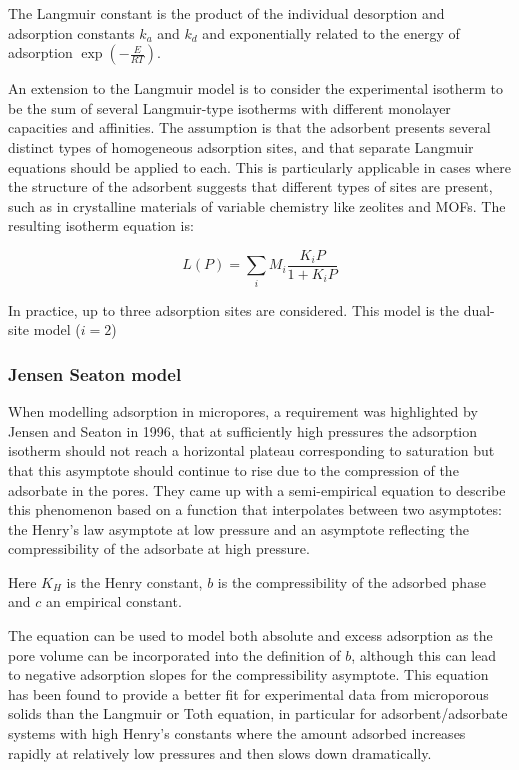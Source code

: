The Langmuir constant is the product of the individual desorption and adsorption constants
\(k_a\) and \(k_d\) and exponentially related to the energy of adsorption
\(\exp{(-\frac{E}{RT})}\).

An extension to the Langmuir model is to consider the experimental isotherm to be
the sum of several Langmuir-type isotherms with different monolayer capacities and affinities.
The assumption is that the adsorbent presents several distinct types of homogeneous adsorption
sites, and that separate Langmuir equations should be applied to each. This is particularly
applicable in cases where the structure of the adsorbent suggests that different types of
sites are present, such as in crystalline materials of variable chemistry like zeolites and MOFs.
The resulting isotherm equation is:

\begin{equation}
    L(P) = \sum_i M_i\frac{K_i P}{1+K_i P}
\end{equation}

In practice, up to three adsorption sites are considered.
This model is the dual-site model (\(i=2\))

\subsubsection{Jensen Seaton model}

When modelling adsorption in micropores, a requirement was highlighted by
Jensen and Seaton in 1996, that at sufficiently high pressures the adsorption
isotherm should not reach a horizontal plateau corresponding to saturation but
that this asymptote should continue to rise due to the compression of the adsorbate
in the pores. They came up with a semi-empirical equation to describe this phenomenon
based on a function that interpolates between two asymptotes: the Henry’s law asymptote
at low pressure and an asymptote reflecting the compressibility of the adsorbate at
high pressure.

Here \(K_H\) is the Henry constant, \(b\) is the compressibility of the
adsorbed phase and \(c\) an empirical constant.

The equation can be used to model both absolute and excess adsorption as the pore
volume can be incorporated into the definition of \(b\), although this can lead
to negative adsorption slopes for the compressibility asymptote.
This equation has been found to provide a better fit for experimental data
from microporous solids than the Langmuir or Toth equation, in particular for
adsorbent/adsorbate systems with high Henry’s constants where the amount adsorbed
increases rapidly at relatively low pressures and then slows down dramatically.

